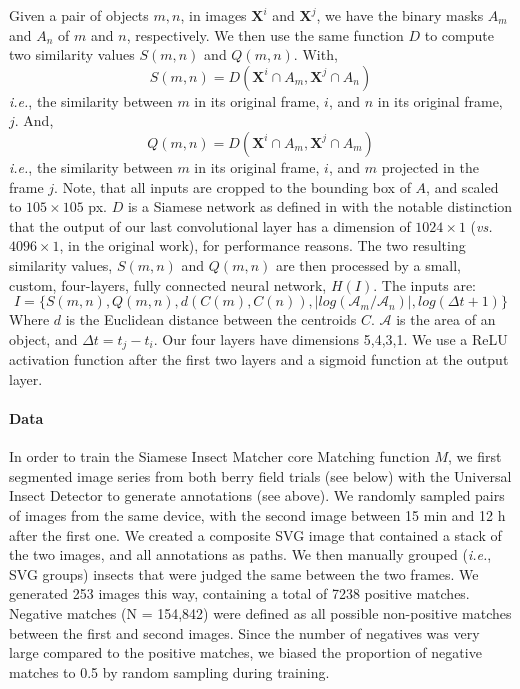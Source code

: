 \documentclass[12pt]{article}
\begin{document}
\begin{linenumbers}
		Given a pair of objects $m, n$, in images $\mathbf{X}^i$ and $\mathbf{X}^j$, we have the binary masks $A_m$ and $A_n$ of $m$ and $n$, respectively.
		We then use the same function $D$ to compute two similarity values $S(m,n)$ and $Q(m,n)$. 
		With,
		$$
		S(m,n) = D(\mathbf{X}^i \cap A_m , \mathbf{X}^j \cap A_n )
		$$
		\emph{i.e.}, the similarity between $m$ in its original frame, $i$, and $n$ in its original frame, $j$. And,
		$$
		Q(m,n) = D(\mathbf{X}^i \cap  A_m , \mathbf{X}^j \cap A_m )
		$$
		\emph{i.e.}, the similarity between $m$ in its original frame, $i$, and $m$ projected in the frame $j$. Note, that all inputs are cropped to the bounding box of $A$, and scaled to $105 \times{} 105$ px. $D$ is a Siamese network as defined in\cite{koch_siamese_2015} with the notable distinction that the output of our last convolutional layer has a dimension of $1024 \times{} 1$ (\emph{vs.} $4096 \times{} 1$, in the original work), for performance reasons. The two resulting similarity values, $S(m,n)$ and $Q(m,n)$ are then processed by a small, custom, four-layers, fully connected neural network, $H(I)$. The inputs are: 
		$$
		I=\{ S(m,n), Q(m,n), d(C(m), C(n)), |log(\mathcal{A}_m/\mathcal{A}_n)|, log(\Delta t + 1)\}
		$$ Where $d$ is the Euclidean distance between the centroids $C$. $\mathcal{A}$ is the area of an object, and $\Delta t = t_j- t_i$. Our four layers have dimensions {5,4,3,1}. We use a ReLU activation function after the first two layers and a sigmoid function at the output layer.

		\paragraph{Data}
		In order to train the Siamese Insect Matcher core Matching function $M$, we first segmented image series from both berry field trials (see below) with the Universal Insect Detector to generate annotations (see above). We randomly sampled pairs of images from the same device, with the second image between 15 min and 12 h after the first one. We created a composite SVG image that contained a stack of the two images, and all annotations as paths. We then manually grouped (\emph{i.e.}, SVG groups) insects that were judged the same between the two frames. We generated 253 images this way, containing a total of 7238 positive matches. Negative matches (N = 154,842) were defined as all possible non-positive matches between the first and second images. Since the number of negatives was very large compared to the positive matches, we biased the proportion of negative matches to 0.5 by random sampling during training.


\end{linenumbers}
\end{document}
